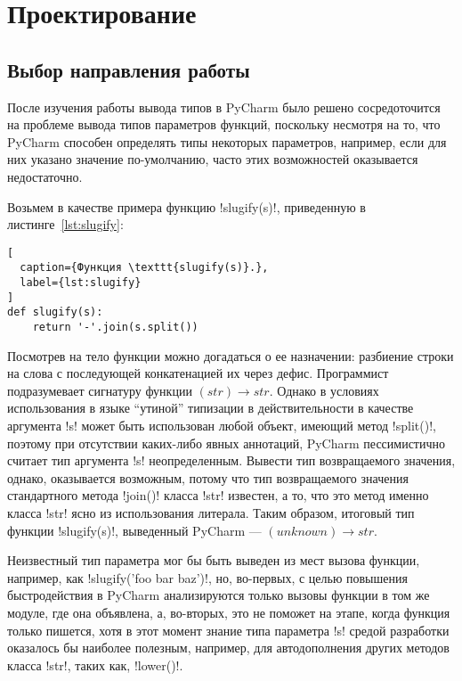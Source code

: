 \chapter{Проектирование}
\label{sec:designing}

\section{Выбор направления работы}
\label{sec:work-direction}

После изучения работы вывода типов в PyCharm было решено сосредоточится на
проблеме вывода типов параметров функций, поскольку несмотря на то, что PyCharm
способен определять типы некоторых параметров, например, если для них указано
значение по-умолчанию, часто этих возможностей оказывается недостаточно.

Возьмем в качестве примера функцию !slugify(s)!, приведенную в
листинге~\ref{lst:slugify}:

\begin{lstlisting}[
  caption={Функция \texttt{slugify(s)}.},
  label={lst:slugify}
]
def slugify(s):
    return '-'.join(s.split())
\end{lstlisting}

Посмотрев на тело функции можно догадаться о ее назначении: разбиение строки на
слова с последующей конкатенацией их через дефис. Программист подразумевает
сигнатуру функции $(str) \rightarrow str$. Однако в условиях использования в языке
``утиной'' типизации в действительности в качестве аргумента !s! может быть использован
любой объект, имеющий метод !split()!, поэтому при отсутствии каких-либо явных
аннотаций, PyCharm пессимистично считает тип аргумента !s!  неопределенным.
Вывести тип возвращаемого значения, однако, оказывается возможным, потому что тип
возвращаемого значения стандартного метода !join()! класса !str! известен, а то,
что это метод именно класса !str! ясно из использования литерала.
Таким образом, итоговый тип функции !slugify(s)!, выведенный PyCharm ---
$(unknown) \rightarrow str$.

Неизвестный тип параметра мог бы быть выведен из мест вызова функции, например, 
как !slugify('foo bar baz')!, но, во-первых, с целью повышения быстродействия в
PyCharm анализируются только вызовы функции в том же модуле, где она объявлена,
а, во-вторых, это не поможет на этапе, когда функция только пишется, хотя
в этот момент знание типа параметра !s! средой разработки оказалось бы наиболее
полезным, например, для автодополнения других методов класса !str!, таких как,
!lower()!.

